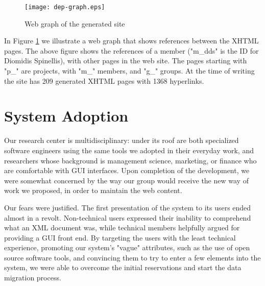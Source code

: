 \documentclass[10pt]{article}
\begin{document}
\begin{figure}
\texttt{[image: dep-graph.eps]}
\caption{Web graph of the generated site}
\label{fig:eltrun-web-m-dds-snapshot}
\end{figure}

In Figure \ref{fig:eltrun-web-m-dds-snapshot} we illustrate a web graph \cite{KRRSTU00} 
that shows references between the {\sc XHTML} pages.
The above figure shows the references  of a member ("m\_dds" is the ID for 
Diomidis Spinellis), with other pages in the web site.
The pages starting with "p\_" are projects, with "m\_" members, and "g\_" groups.
At the time of writing the site has 209 generated {\sc XHTML} pages with 1368 hyperlinks. 

\section{System Adoption}
\label{sec:adopt}

Our research center is multidisciplinary: under its roof
are both specialized software engineers using the same tools
we adopted in their everyday work, and researchers whose
background is management science, marketing, or finance
who are comfortable with {\sc GUI} interfaces.
Upon completion of the development, we were somewhat concerned by the way our group
would receive the new way of work we proposed, in order to maintain the web content.

Our fears were justified.
The first presentation of the system to its users ended
almost in a revolt.
Non-technical users expressed their inability to comprehend
what an {\sc XML} document was, while technical members
helpfully argued for providing a {\sc GUI} front end.
By targeting the users with the least technical experience,
promoting our system's "vague" attributes,
such as the use of open source software tools,
and convincing them to try to enter a few elements into
the system, we were able to overcome the initial reservations
and start the data migration process.
\end{document}

